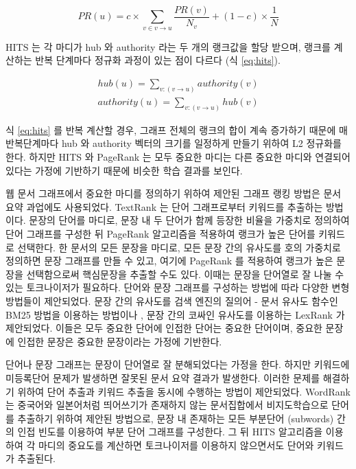 \documentclass[oneside, ko,phd]{snuthesis_utf8_kor}
\begin{document}
\begin{equation}
  \label{eq:pagerank2}
  PR(u) = c \times \sum_{v \in v \rightarrow u} \frac{PR(v)}{N_v} + (1-c) \times \frac{1}{N}
\end{equation}

HITS 는 각 마디가 hub 와 authority 라는 두 개의 랭크값을 할당 받으며, 랭크를 계산하는 반복 단계마다 정규화 과정이 있는 점이 다르다 (식 \ref{eq:hits}).

\begin{equation}
  \label{eq:hits}
  \begin{aligned}
  hub(u) = \sum_{v:(v \rightarrow u)} authority(v) \\
  authority(u) = \sum_{v:(v \rightarrow u)} hub(v)
  \end{aligned}
\end{equation}

식 \ref{eq:hits} 를 반복 계산할 경우, 그래프 전체의 랭크의 합이 계속 증가하기 때문에 매 반복단계마다 hub 와 authority 벡터의 크기를 일정하게 만들기 위하여 L2 정규화를 한다.
하지만 HITS 와 PageRank 는 모두 중요한 마디는 다른 중요한 마디와 연결되어 있다는 가정에 기반하기 때문에 비슷한 학습 결과를 보인다.

웹 문서 그래프에서 중요한 마디를 정의하기 위하여 제안된 그래프 랭킹 방법은 문서 요약 과업에도 사용되었다.
TextRank \cite{mihalcea2004textrank} 는 단어 그래프로부터 키워드를 추출하는 방법이다.
문장의 단어를 마디로, 문장 내 두 단어가 함께 등장한 비율을 가중치로 정의하여 단어 그래프를 구성한 뒤 PageRank 알고리즘을 적용하여 랭크가 높은 단어를 키워드로 선택한다.
한 문서의 모든 문장을 마디로, 모든 문장 간의 유사도를 호의 가중치로 정의하면 문장 그래프를 만들 수 있고, 여기에 PageRank 를 적용하여 랭크가 높은 문장을 선택함으로써 핵심문장을 추출할 수도 있다.
이때는 문장을 단어열로 잘 나눌 수 있는 토크나이저가 필요하다.
단어와 문장 그래프를 구성하는 방법에 따라 다양한 변형 방법들이 제안되었다.
문장 간의 유사도를 검색 엔진의 질의어 - 문서 유사도 함수인 BM25 \cite{robertson2009probabilistic} 방법을 이용하는 방법이나 \cite{barrios2016variations}, 문장 간의 코싸인 유사도를 이용하는 LexRank \cite{erkan2004lexrank} 가 제안되었다.
이들은 모두 중요한 단어에 인접한 단어는 중요한 단어이며, 중요한 문장에 인접한 문장은 중요한 문장이라는 가정에 기반한다.

단어나 문장 그래프는 문장이 단어열로 잘 분해되었다는 가정을 한다.
하지만 키워드에 미등록단어 문제가 발생하면 잘못된 문서 요약 결과가 발생한다.
이러한 문제를 해결하기 위하여 단어 추출과 키워드 추출을 동시에 수행하는 방법이 제안되었다.
WordRank \cite{chen2011simple} 는 중국어와 일본어처럼 띄어쓰기가 존재하지 않는 문서집합에서 비지도학습으로 단어를 추출하기 위하여 제안된 방법으로, 문장 내 존재하는 모든 부분단어 (subwords) 간의 인접 빈도를 이용하여 부분 단어 그래프를 구성한다.
그 뒤 HITS 알고리즘을 이용하여 각 마디의 중요도를 계산하면 토크나이저를 이용하지 않으면서도 단어와 키워드가 추출된다.
\end{document}
